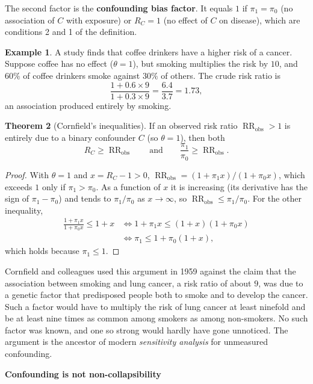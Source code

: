\documentclass[11pt,a4paper]{article}
\numberwithin{equation}{section}
\DeclareMathOperator{\RR}{RR}
\theoremstyle{definition}
\newtheorem{thm}{Theorem}[subsection]
\newtheorem{exa}[thm]{Example}
\newcommand{\subhead}[1]{%
  \par\medskip\noindent\textbf{#1}\par\nobreak\smallskip}
\begin{document}
The second factor is the \textbf{confounding bias factor}. It equals $1$ if $\pi_1 = \pi_0$ (no association of $C$ with exposure) or $R_C = 1$ (no
effect of $C$ on disease), which are conditions 2 and 1 of the definition.

\begin{exa}
\label{exa:coffee}
A study finds that coffee drinkers have a higher risk of a cancer. Suppose coffee has no effect ($\theta = 1$), but smoking multiplies the
risk by $10$, and $60\%$ of coffee drinkers smoke against $30\%$ of others. The crude risk ratio is
\[
\frac{1 + 0.6 \times 9}{1 + 0.3 \times 9} = \frac{6.4}{3.7} = 1.73 ,
\]
an association produced entirely by smoking.
\end{exa}

\begin{thm}[Cornfield's inequalities]
\label{thm:cornfield}
If an observed risk ratio $\RR_{\text{obs}} > 1$ is entirely due to a binary confounder $C$ (so $\theta = 1$), then both
\[
R_C \geq \RR_{\text{obs}} \qquad\text{and}\qquad \frac{\pi_1}{\pi_0} \geq \RR_{\text{obs}} .
\]
\end{thm}

\begin{proof}
With $\theta = 1$ and $x = R_C - 1 > 0$, $\RR_{\text{obs}} = (1 + \pi_1 x)/(1 + \pi_0 x)$, which exceeds $1$ only if $\pi_1 > \pi_0$. As a function of $x$ it is increasing
(its derivative has the sign of $\pi_1 - \pi_0$) and tends to $\pi_1/\pi_0$ as $x \to \infty$, so $\RR_{\text{obs}} \leq \pi_1/\pi_0$. For the other inequality,
\begin{align*}
\frac{1 + \pi_1 x}{1 + \pi_0 x} \leq 1 + x &\iff 1 + \pi_1 x \leq (1 + x)(1 + \pi_0 x) \\
&\iff \pi_1 \leq 1 + \pi_0(1 + x) ,
\end{align*}
which holds because $\pi_1 \leq 1$.
\end{proof}

Cornfield and colleagues used this argument in 1959 against the claim that the association between smoking and lung cancer, a risk
ratio of about $9$, was due to a genetic factor that predisposed people both to smoke and to develop the cancer. Such a factor would
have to multiply the risk of lung cancer at least ninefold and be at least nine times as common among smokers as among non-smokers.
No such factor was known, and one so strong would hardly have gone unnoticed. The argument is the ancestor of modern
\emph{sensitivity analysis} for unmeasured confounding.

\subhead{Confounding is not non-collapsibility}
\end{document}
